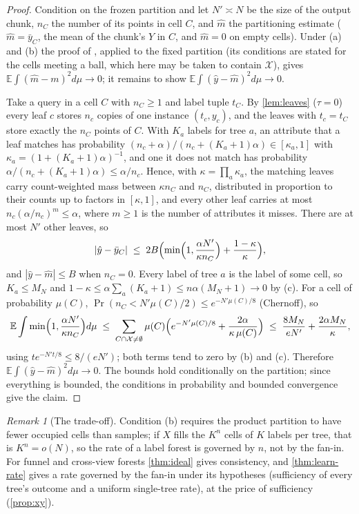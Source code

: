 \documentclass[11pt]{article}
\theoremstyle{definition}
\theoremstyle{remark}
\newtheorem{remark}[theorem]{Remark}
\newcommand{\E}{\mathbb{E}}
\newcommand{\hy}{\hat{y}}
\begin{document}
\begin{proof}
Condition on the frozen partition and let $N'\asymp N$ be the size of the output chunk,
$n_C$ the number of its points in cell $C$, and $\hat m$ the partitioning estimate
($\hat m=\bar y_C$, the mean of the chunk's $Y$ in $C$, and $\hat m=0$ on empty cells).
Under (a) and (b) the proof of \citet[Thm.~4.2]{gyorfi2002}, applied to the fixed
partition (its conditions are stated for the cells meeting a ball, which here may be
taken to contain $\mathcal X$), gives $\E\int(\hat m-m)^2d\mu\to0$; it remains to show
$\E\int(\hy-\hat m)^2d\mu\to0$.

Take a query in a cell $C$ with $n_C\ge1$ and label tuple $t_C$.  By \cref{lem:leaves}
($\tau=0$) every leaf $c$ stores $n_c$ copies of one instance $(t_c,y_c)$, and the leaves
with $t_c=t_C$ store exactly the $n_C$ points of $C$.  With $K_a$ labels for tree $a$, an
attribute that a leaf matches has probability
$(n_c+\alpha)/(n_c+(K_a+1)\alpha)\in[\kappa_a,1]$ with $\kappa_a=(1+(K_a+1)\alpha)^{-1}$, and
one it does not match has probability $\alpha/(n_c+(K_a+1)\alpha)\le\alpha/n_c$.  Hence,
with $\kappa=\prod_a\kappa_a$, the matching leaves carry count-weighted mass between
$\kappa n_C$ and $n_C$, distributed in proportion to their counts up to factors in
$[\kappa,1]$, and every other leaf carries at most $n_c(\alpha/n_c)^m\le\alpha$, where
$m\ge1$ is the number of attributes it misses.  There are at most $N'$ other leaves, so
\[
  |\hy-\bar y_C|\;\le\;2B\Bigl(\min\Bigl(1,\frac{\alpha N'}{\kappa n_C}\Bigr)+\frac{1-\kappa}{\kappa}\Bigr),
\]
and $|\hy-\hat m|\le B$ when $n_C=0$.  Every label of tree $a$ is the label of some cell,
so $K_a\le M_N$ and $1-\kappa\le\alpha\sum_a(K_a+1)\le n\alpha(M_N+1)\to0$ by (c).  For a cell of probability $\mu(C)$,
$\Pr(n_C<N'\mu(C)/2)\le e^{-N'\mu(C)/8}$ (Chernoff), so
\[
  \E\int\min\Bigl(1,\frac{\alpha N'}{\kappa n_C}\Bigr)d\mu\;\le\;
  \sum_{C\cap\mathcal X\ne\emptyset}\mu(C)\Bigl(e^{-N'\mu(C)/8}+\frac{2\alpha}{\kappa\,\mu(C)}\Bigr)
  \;\le\;\frac{8M_N}{eN'}+\frac{2\alpha M_N}{\kappa},
\]
using $te^{-N't/8}\le8/(eN')$; both terms tend to zero by (b) and (c).  Therefore $\E\int(\hy-\hat m)^2d\mu\to0$.  The bounds hold conditionally on the
partition; since everything is bounded, the conditions in probability and bounded
convergence give the claim.
\end{proof}

\begin{remark}[The trade-off]\label{rem:tradeoff}
Condition (b) requires the product partition to have fewer occupied cells than samples;
if $X$ fills the $K^n$ cells of $K$ labels per tree, that is $K^n=o(N)$, so the rate of a
label forest is governed by $n$, not by the fan-in.  For funnel and cross-view forests
\cref{thm:ideal} gives consistency, and \cref{thm:learn-rate} gives a rate governed by the
fan-in under its hypotheses (sufficiency of every tree's outcome and a uniform single-tree
rate), at the price of sufficiency (\cref{prop:xy}).
\end{remark}
\end{document}
